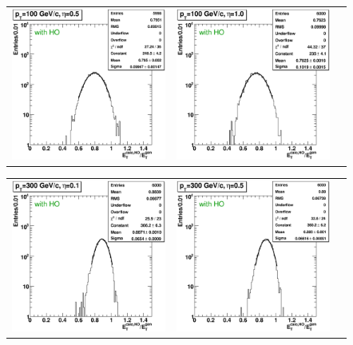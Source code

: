 \documentclass{cmspaper}
\begin{document}
\begin{appendices}
\begin{center}
\begin{tabular}{lll}
 \includegraphics[width=2in]{figs/h_ETRatioWithHO_ET_py_fit_corr_eta0.5_pT100.eps} &
 \includegraphics[width=2in]{figs/h_ETRatioWithHO_ET_py_fit_corr_eta1.0_pT100.eps} \\
\end{tabular}
\end{center}
\begin{center}
\begin{tabular}{lll}
 \includegraphics[width=2in]{figs/h_ETRatioWithHO_ET_py_fit_corr_eta0.1_pT300.eps} &
 \includegraphics[width=2in]{figs/h_ETRatioWithHO_ET_py_fit_corr_eta0.5_pT300.eps} &

\end{tabular}
\end{center}
\end{appendices}
\end{document}
